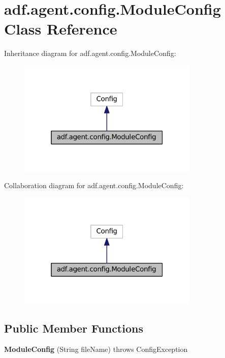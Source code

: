 \hypertarget{classadf_1_1agent_1_1config_1_1ModuleConfig}{}\section{adf.\+agent.\+config.\+Module\+Config Class Reference}
\label{classadf_1_1agent_1_1config_1_1ModuleConfig}


Inheritance diagram for adf.\+agent.\+config.\+Module\+Config\+:
\nopagebreak
\begin{figure}[H]
\begin{center}
\leavevmode
\includegraphics[width=244pt]{classadf_1_1agent_1_1config_1_1ModuleConfig__inherit__graph}
\end{center}
\end{figure}


Collaboration diagram for adf.\+agent.\+config.\+Module\+Config\+:
\nopagebreak
\begin{figure}[H]
\begin{center}
\leavevmode
\includegraphics[width=244pt]{classadf_1_1agent_1_1config_1_1ModuleConfig__coll__graph}
\end{center}
\end{figure}
\subsection*{Public Member Functions}
\begin{DoxyCompactItemize}
\item 
\hypertarget{classadf_1_1agent_1_1config_1_1ModuleConfig_a855a4e62881a6bf754265a148228817f}{}\label{classadf_1_1agent_1_1config_1_1ModuleConfig_a855a4e62881a6bf754265a148228817f} 
{\bfseries Module\+Config} (String file\+Name)  throws Config\+Exception     
\end{DoxyCompactItemize}
